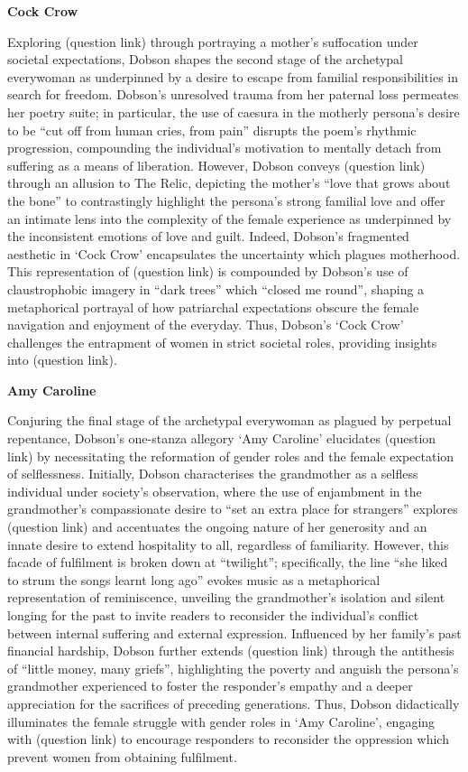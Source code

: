 	\textbf{Cock Crow}

	Exploring (question link) through portraying a mother’s suffocation under societal expectations, Dobson shapes the second stage of the archetypal everywoman as underpinned by a desire to escape from familial responsibilities in search for freedom. Dobson’s unresolved trauma from her paternal loss permeates her poetry suite; in particular, the use of caesura in the motherly persona’s desire to be “cut off from human cries, from pain” disrupts the poem’s rhythmic progression, compounding the individual’s motivation to mentally detach from suffering as a means of liberation. However, Dobson conveys (question link) through an allusion to The Relic, depicting the mother’s “love that grows about the bone” to contrastingly highlight the persona’s strong familial love and offer an intimate lens into the complexity of the female experience as underpinned by the inconsistent emotions of love and guilt. Indeed, Dobson’s fragmented aesthetic in ‘Cock Crow’ encapsulates the uncertainty which plagues motherhood. This representation of (question link) is compounded by Dobson’s use of claustrophobic imagery in “dark trees” which “closed me round”, shaping a metaphorical portrayal of how patriarchal expectations obscure the female navigation and enjoyment of the everyday. Thus, Dobson’s ‘Cock Crow’ challenges the entrapment of women in strict societal roles, providing insights into (question link).


	\textbf{Amy Caroline}

	Conjuring the final stage of the archetypal everywoman as plagued by perpetual repentance, Dobson’s one-stanza allegory ‘Amy Caroline’ elucidates (question link) by necessitating the reformation of gender roles and the female expectation of selflessness. Initially, Dobson characterises the grandmother as a selfless individual under society’s observation, where the use of enjambment in the grandmother's compassionate desire to “set an extra place for strangers'' explores (question link) and accentuates the ongoing nature of her generosity and an innate desire to extend hospitality to all, regardless of familiarity. However, this facade of fulfilment is broken down at “twilight”; specifically, the line “she liked to strum the songs learnt long ago” evokes music as a metaphorical representation of reminiscence, unveiling the grandmother's isolation and silent longing for the past to invite readers to reconsider the individual’s conflict between internal suffering and external expression. Influenced by her family’s past financial hardship, Dobson further extends (question link) through the antithesis of “little money, many griefs”, highlighting the poverty and anguish the persona’s grandmother experienced to foster the responder’s empathy and a deeper appreciation for the sacrifices of preceding generations. Thus, Dobson didactically illuminates the female struggle with gender roles in ‘Amy Caroline’, engaging with (question link) to encourage responders to reconsider the oppression which prevent women from obtaining fulfilment. 

